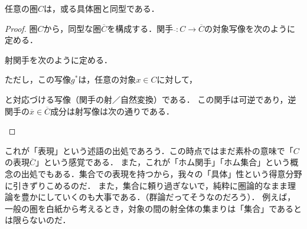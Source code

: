 \documentclass[uplatex, 12pt, dvipdfmx]{jsarticle}
\begin{document}
\begin{theorem}
    任意の圏$C$は，或る具体圏と同型である．
\end{theorem}
\begin{proof}
    圏$C$から，同型な圏$\overline{C}$を構成する．関手$\overline{　}:C\to\overline{C}$の対象写像を次のように定める．
    \begin{center}\end{center}
    射関手を次のように定める．
    \begin{center}\end{center}
    ただし，この写像$g^*$は，任意の対象$x\in C$に対して，
    \begin{center}\end{center}
    と対応づける写像（関手の射／自然変換）である．
    この関手は可逆であり，逆関手の$\overline{x}\in\overline{C}$成分は射写像は次の通りである．
    \begin{center}\end{center}
\end{proof}
\begin{remark*}
    これが「表現」という述語の出処であろう．この時点ではまだ素朴の意味で「$C$の表現$\overline{C}$」という感覚である．
    また，これが「ホム関手」「ホム集合」という概念の出処でもある．集合での表現を持つから，我々の「具体」性という得意分野に引きずりこめるのだ．
    また，集合に頼り過ぎないで，純粋に圏論的なまま理論を豊かにしていくのも大事である．（群論だってそうなのだろう）．
    例えば，一般の圏を白紙から考えるとき，対象の間の射全体の集まりは「集合」であるとは限らないのだ．
\end{remark*}
\end{document}
